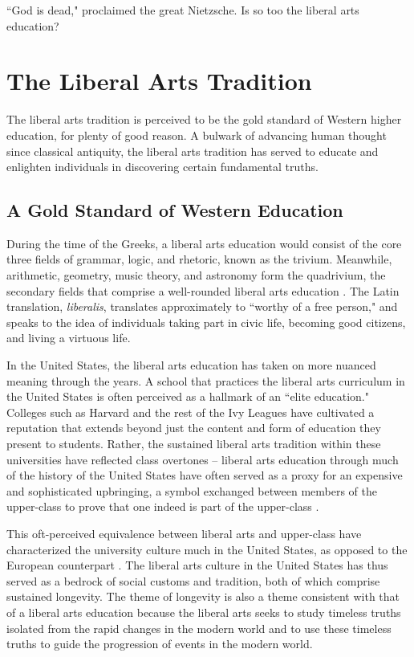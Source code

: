\documentclass[12pt,letterpaper]{article}
\newif\ifdraft
\begin{document}
\ifdraft
And I too was one of them, and there I looked, just couldn't help but noticing a certain look in Puett's face that can best be described as pity.
\fi

``God is dead," proclaimed the great Nietzsche.  Is so too the liberal arts education?

\section{The Liberal Arts Tradition}
The liberal arts tradition is perceived to be the gold standard of Western higher education, for plenty of good reason.  A bulwark of advancing human thought since classical antiquity, the liberal arts tradition has served to educate and enlighten individuals in discovering certain fundamental truths.

\subsection{A Gold Standard of Western Education}
During the time of the Greeks, a liberal arts  education would consist of the core three fields of grammar, logic, and rhetoric, known as the trivium.  Meanwhile, arithmetic, geometry, music theory, and astronomy form the quadrivium, the secondary fields that comprise a well-rounded liberal arts education \cite{tubbs_philosophy_2015}.  The Latin translation, \textit{liberalis}, translates approximately to ``worthy of a free person," and speaks to the idea of individuals taking part in civic life, becoming good citizens, and living a virtuous life.  

In the United States, the liberal arts education has taken on more nuanced meaning through the years.  A school that practices the liberal arts curriculum in the United States is often perceived as a hallmark of an ``elite education."  Colleges such as Harvard and the rest of the Ivy Leagues have cultivated a reputation that extends beyond just the content and form of education they present to students.  Rather, the sustained liberal arts tradition within these universities have reflected class overtones -- liberal arts education through much of the history of the United States have often served as a proxy for an expensive and sophisticated upbringing, a symbol exchanged between members of the upper-class to prove that one indeed is part of the upper-class \cite{noauthor_americans_nodate}.  

This oft-perceived equivalence between liberal arts and upper-class have characterized the university culture much in the United States, as opposed to the European counterpart \cite{noauthor_european-american_nodate}.  The liberal arts culture in the United States has thus served as a bedrock of social customs and tradition, both of which comprise sustained longevity.  The theme of longevity is also a theme consistent with that of a liberal arts education because the liberal arts seeks to study timeless truths isolated from the rapid changes in the modern world and to use these timeless truths to guide the progression of events in the modern world.
\end{document}
